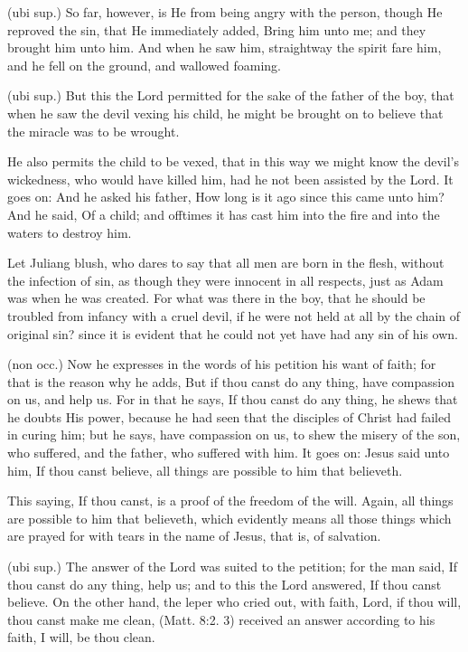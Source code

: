  (ubi sup.) So far, however, is He from being angry with the person, though He reproved the sin, that He immediately added, Bring him unto me; and they brought him unto him. And when he saw him, straightway the spirit fare him, and he fell on the ground, and wallowed foaming.

 (ubi sup.) But this the Lord permitted for the sake of the father of the boy, that when he saw the devil vexing his child, he might be brought on to believe that the miracle was to be wrought.

 He also permits the child to be vexed, that in this way we might know the devil’s wickedness, who would have killed him, had he not been assisted by the Lord. It goes on: And he asked his father, How long is it ago since this came unto him? And he said, Of a child; and offtimes it has cast him into the fire and into the waters to destroy him.

 Let Juliang blush, who dares to say that all men are born in the flesh, without the infection of sin, as though they were innocent in all respects, just as Adam was when he was created. For what was there in the boy, that he should be troubled from infancy with a cruel devil, if he were not held at all by the chain of original sin? since it is evident that he could not yet have had any sin of his own.

 (non occ.) Now he expresses in the words of his petition his want of faith; for that is the reason why he adds, But if thou canst do any thing, have compassion on us, and help us. For in that he says, If thou canst do any thing, he shews that he doubts His power, because he had seen that the disciples of Christ had failed in curing him; but he says, have compassion on us, to shew the misery of the son, who suffered, and the father, who suffered with him. It goes on: Jesus said unto him, If thou canst believe, all things are possible to him that believeth.

 This saying, If thou canst, is a proof of the freedom of the will. Again, all things are possible to him that believeth, which evidently means all those things which are prayed for with tears in the name of Jesus, that is, of salvation.

 (ubi sup.) The answer of the Lord was suited to the petition; for the man said, If thou canst do any thing, help us; and to this the Lord answered, If thou canst believe. On the other hand, the leper who cried out, with faith, Lord, if thou will, thou canst make me clean, (Matt. 8:2. 3) received an answer according to his faith, I will, be thou clean.

